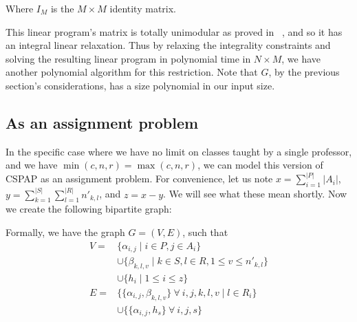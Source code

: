Where $I_M$ is the $M \times M$ identity matrix.

This linear program's matrix is totally unimodular as proved in ~\cite{Ahuja93}, and so it has an integral linear relaxation. Thus by relaxing the integrality constraints and solving the resulting linear program in polynomial time in $N \times M$, we have another polynomial algorithm for this restriction. Note that $G$, by the previous section's considerations, has a size polynomial in our input size.

\subsection{As an assignment problem}

In the specific case where we have no limit on classes taught by a single professor, and we have $\min(c, n, r) = \max(c, n, r)$, we can model this version of CSPAP as an assignment problem. For convenience, let us note $x = \sum_{i = 1}^{|P|} |A_i|$, $y = \sum_{k = 1}^{|S|} \sum_{l = 1}^{|R|} n'_{k, l}$, and $z = x - y$. We will see what these mean shortly. Now we create the following bipartite graph:

\begin{center}
\end{center}

Formally, we have the graph $G = (V, E)$, such that
\begin{align*}
V = & \{\alpha_{i, j} \mid i \in P, j \in A_i\}\\
    & \cup \{\beta_{k, l, v} \mid k \in S, l \in R, 1 \le v \le n'_{k, l}\}\\
    & \cup \{h_i \mid 1 \le i \le z\}\\
E = & \{\{\alpha_{i, j}, \beta_{k, l, v}\}\ \forall\ i, j, k, l, v \mid l \in R_i\}\\
    & \cup \{\{\alpha_{i, j}, h_s\}\ \forall\ i, j, s\}
\end{align*}

